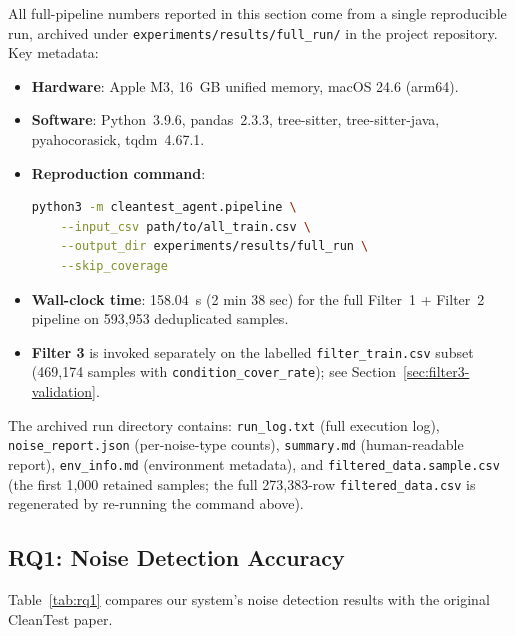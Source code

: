 \documentclass[acmlarge,nonacm,screen]{acmart}
\begin{document}
All full-pipeline numbers reported in this section come from a single
reproducible run, archived under \texttt{experiments/results/full\_run/}
in the project repository. Key metadata:

\begin{itemize}
    \item \textbf{Hardware}: Apple M3, 16~GB unified memory, macOS 24.6 (arm64).
    \item \textbf{Software}: Python~3.9.6, pandas~2.3.3, tree-sitter, tree-sitter-java, pyahocorasick, tqdm~4.67.1.
    \item \textbf{Reproduction command}:
\begin{lstlisting}[language=bash]
python3 -m cleantest_agent.pipeline \
    --input_csv path/to/all_train.csv \
    --output_dir experiments/results/full_run \
    --skip_coverage
\end{lstlisting}
    \item \textbf{Wall-clock time}: 158.04~s (2 min 38 sec) for the full Filter~1 + Filter~2 pipeline on 593{,}953 deduplicated samples.
    \item \textbf{Filter 3} is invoked separately on the labelled \texttt{filter\_train.csv} subset (469{,}174 samples with \texttt{condition\_cover\_rate}); see Section~\ref{sec:filter3-validation}.
\end{itemize}

The archived run directory contains: \texttt{run\_log.txt} (full execution
log), \texttt{noise\_report.json} (per-noise-type counts), \texttt{summary.md}
(human-readable report), \texttt{env\_info.md} (environment metadata), and
\texttt{filtered\_data.sample.csv} (the first 1{,}000 retained samples;
the full 273{,}383-row \texttt{filtered\_data.csv} is regenerated by
re-running the command above).

\subsection{RQ1: Noise Detection Accuracy}

Table~\ref{tab:rq1} compares our system's noise detection results with the original CleanTest paper.
\end{document}

